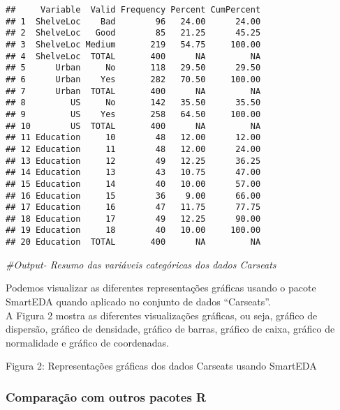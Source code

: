 \documentclass[
]{article}
\newenvironment{Shaded}{\begin{snugshade}}{\end{snugshade}}
\newcommand{\CommentTok}[1]{\textcolor[rgb]{0.56,0.35,0.01}{\textit{#1}}}
\begin{document}
\begin{verbatim}
##     Variable  Valid Frequency Percent CumPercent
## 1  ShelveLoc    Bad        96   24.00      24.00
## 2  ShelveLoc   Good        85   21.25      45.25
## 3  ShelveLoc Medium       219   54.75     100.00
## 4  ShelveLoc  TOTAL       400      NA         NA
## 5      Urban     No       118   29.50      29.50
## 6      Urban    Yes       282   70.50     100.00
## 7      Urban  TOTAL       400      NA         NA
## 8         US     No       142   35.50      35.50
## 9         US    Yes       258   64.50     100.00
## 10        US  TOTAL       400      NA         NA
## 11 Education     10        48   12.00      12.00
## 12 Education     11        48   12.00      24.00
## 13 Education     12        49   12.25      36.25
## 14 Education     13        43   10.75      47.00
## 15 Education     14        40   10.00      57.00
## 16 Education     15        36    9.00      66.00
## 17 Education     16        47   11.75      77.75
## 18 Education     17        49   12.25      90.00
## 19 Education     18        40   10.00     100.00
## 20 Education  TOTAL       400      NA         NA
\end{verbatim}

\begin{Shaded}
\begin{Highlighting}[]
\CommentTok{\#Output{-} Resumo das variáveis categóricas dos dados Carseats}
\end{Highlighting}
\end{Shaded}

Podemos visualizar as diferentes representações gráficas usando o pacote
SmartEDA quando aplicado no conjunto de dados ``Carseats''.\\
A Figura 2 mostra as diferentes visualizações gráficas, ou seja, gráfico
de dispersão, gráfico de densidade, gráfico de barras, gráfico de caixa,
gráfico de normalidade e gráfico de coordenadas.

Figura 2: Representações gráficas dos dados Carseats usando SmartEDA

\hypertarget{comparauxe7uxe3o-com-outros-pacotes-r}{%
\subsubsection{Comparação com outros pacotes
R}\label{comparauxe7uxe3o-com-outros-pacotes-r}}
\end{document}

